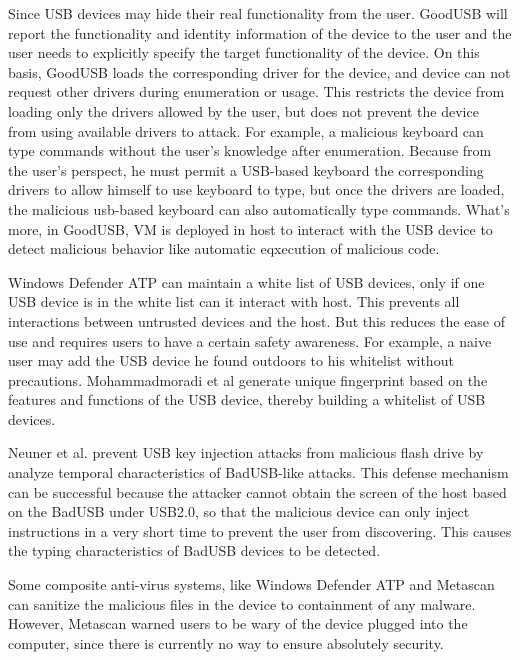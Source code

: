 Since USB devices may hide their real functionality from the user. GoodUSB\cite{tian2015defending} will report the functionality and identity information of the device to the user and the user needs to explicitly specify the target functionality of the device. On this basis, GoodUSB loads the corresponding driver for the device, and device can not request other drivers during enumeration or usage. This restricts the device from loading only the drivers allowed by the user, but does not prevent the device from using available drivers to attack. For example, a malicious keyboard can type commands without the user's knowledge after enumeration. Because from the user's perspect, he must permit a USB-based keyboard the corresponding drivers to allow himself to use keyboard to type, but once the drivers are loaded, the malicious usb-based keyboard can also automatically type commands. What's more, in GoodUSB, VM is deployed in host to interact with the USB device to detect malicious behavior like automatic eqxecution of malicious code.
 
Windows Defender ATP\cite{windenfenderwhite} can maintain a white list of USB devices, only if one USB device is in the white list can it interact with host. This prevents all interactions between untrusted devices and the host. But this reduces the ease of use and requires users to have a certain safety awareness. For example, a naive user may add the USB device he found outdoors to his whitelist without precautions. Mohammadmoradi et al\cite{mohammadmoradi2018making} generate unique fingerprint based on the features and functions of the USB device, thereby building a whitelist of USB devices.

Neuner et al.\cite{neuner2018usblock} prevent USB key injection attacks from malicious flash drive by analyze temporal characteristics of BadUSB-like attacks. This defense mechanism can be successful because the attacker cannot obtain the screen of the host based on the BadUSB under USB2.0, so that the malicious device can only inject instructions in a very short time to prevent the user from discovering. This causes the typing characteristics of BadUSB devices to be detected.

Some composite anti-virus systems, like Windows Defender ATP\cite{windenfender} and Metascan\cite{OPSWAT} can sanitize the malicious files in the device to containment of any malware. However, Metascan warned users to be wary of the device plugged into the computer, since there is currently no way to ensure absolutely security.


